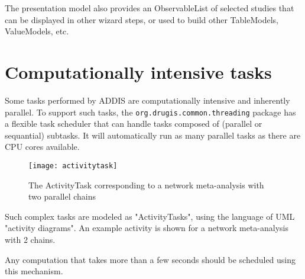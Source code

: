 \documentclass[a4paper]{article}
\begin{document}
The presentation model also provides an ObservableList of selected studies that can be displayed in other wizard steps, or used to build other TableModels, ValueModels, etc.

\section{Computationally intensive tasks}

Some tasks performed by ADDIS are computationally intensive and inherently parallel.
To support such tasks, the {\tt org.drugis.common.threading} package has a flexible task scheduler that can handle tasks composed of (parallel or sequantial) subtasks.
It will automatically run as many parallel tasks as there are CPU cores available.

\begin{figure}[h]
\centering
\texttt{[image: activitytask]}
\caption{The ActivityTask corresponding to a network meta-analysis with two parallel chains}
\end{figure}

Such complex tasks are modeled as "ActivityTasks", using the language of UML "activity diagrams".
An example activity is shown for a network meta-analysis with 2 chains.

Any computation that takes more than a few seconds should be scheduled using this mechanism.
\end{document}
